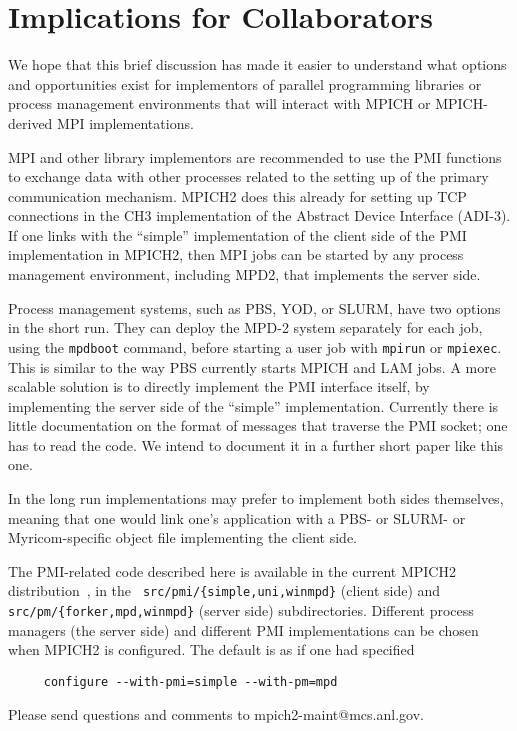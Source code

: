 \documentclass[11pt]{article}
\begin{document}
\section{Implications for Collaborators}
\label{sec:implications}

We hope that this brief discussion has made it easier to understand what
options and opportunities exist for implementors of parallel programming
libraries or process management environments that will interact with
MPICH or MPICH-derived MPI implementations.

MPI and other library implementors are recommended to use the PMI
functions to exchange data with other processes related to the setting
up of the primary communication mechanism.  MPICH2 does this already for
setting up TCP connections in the CH3 implementation of the Abstract
Device Interface (ADI-3).  If one links with the ``simple''
implementation of the client side of the PMI implementation in MPICH2,
then MPI jobs can be started by any process management environment,
including MPD2, that implements the server side.

Process management systems, such as PBS, YOD, or SLURM, have two options
in the short run.  They can deploy the MPD-2 system separately for each
job, using the {\tt mpdboot} command, before starting a user job with
{\tt mpirun} or {\tt mpiexec}.  This is similar to the way PBS currently
starts MPICH and LAM jobs.  A more scalable solution is to directly
implement the PMI interface itself, by implementing the server side of
the ``simple'' implementation.  Currently there is little
documentation on the format of messages that traverse the PMI socket;
one has to read the code.  We intend to document it in a further short paper
like this one.

In the long run implementations may prefer to implement both sides
themselves, meaning that one would link one's application with a PBS- or
SLURM- or Myricom-specific object file implementing the client side.

The PMI-related code described here is available in the current MPICH2
distribution~\cite{mpich2-web-page}, in the {\tt
  src/pmi/\{simple,uni,winmpd\}} (client side) and {\tt
  src/pm/\{forker,mpd,winmpd\}} (server side) subdirectories.
Different process managers (the server side) and different PMI
implementations can be chosen when MPICH2 is configured.  The default is
as if one had specified
\begin{verbatim}
     configure --with-pmi=simple --with-pm=mpd
\end{verbatim}
Please send questions and comments to mpich2-maint@mcs.anl.gov.



\end{document}
